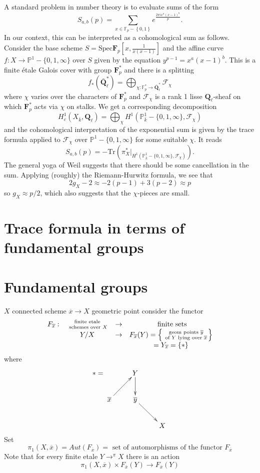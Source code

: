 A standard problem in number theory is to evaluate sums of the form
$$
S_{a,b}(p) = \sum_{x\in \mathbb F_p-\left\{0, 1\right\}} e^{\frac{2\pi
ix^a(x-1)^b}{p}}.
$$
In our context, this can be interpreted as a cohomological sum as follows.
Consider the base scheme $S = \text{Spec} \mathbf{F}_p\left[x,
\frac{1}{x(x-1)}\right]$ and the affine curve $f: X \to \mathbb P^1-\{0, 1,
\infty\}$ over $S$ given by the equation $y^{p-1} = x^a(x-1)^b$. This is a
finite \'etale Galois cover with group $\mathbf{F}_p^*$ and there is a splitting
$$
f_*(\bar{\mathbf{Q}}_\ell^*) =
\bigoplus_{\chi : \mathbb F_p^*\to \bar{\mathbf{Q}}_\ell^*} \mathcal{F}_\chi
$$
where $\chi$ varies over the characters of $\mathbf{F}_p^*$ and
$\mathcal{F}_\chi$ is a rank 1 lisse $\mathbf{Q}_\ell$-sheaf on which
$\mathbf{F}_p^*$ acts via $\chi$ on stalks. We get a corresponding decomposition
$$
H_c^1(X_{\bar k}, \mathbf{Q}_\ell) = \bigoplus_\chi H^1(\mathbb P_{\bar
k}^1-\{0, 1, \infty\}, \mathcal{F}_\chi)
$$
and the cohomological interpretation of the exponential sum is given by the
trace formula applied to $\mathcal{F}_\chi$ over $\mathbb P^1 - \{0, 1,
\infty\}$ for some suitable $\chi$. It reads
$$
S_{a,b}(p) = -\text{Tr}\left(\pi_X^*\big|_{H^1(\mathbb P_{\bar k}^1-\{0, 1,
\infty\}, \mathcal{F}_\chi)}\right).
$$
The general yoga of Weil suggests that there should be some cancellation in the
sum. Applying (roughly) the Riemann-Hurwitz formula, we see that
$$
2g_X-2 \approx -2 (p-1) + 3(p-2) \approx p
$$
so $g_X\approx p/2$, which also suggests that the $\chi$-pieces are small.




\section{Trace formula in terms of fundamental groups}

\section{Fundamental groups} $X$ connected scheme $\overline x\to X$ geometric
point consider the functor
$$
\begin{matrix}
F_{\overline x}: &
\text{ finite etale }\atop \text{ schemes over } X &
\to & \text{ finite sets} \\
&
Y/X &
\to &
F_{\overline x}(Y) =
\left\{\text{ geom points }\overline y\atop \text{ of } Y
\text{ lying over }\overline x\right\} \\
&
&
&
= Y_{\overline x} = \left\{ * \right\}
\end{matrix}
$$
where
$$
* =
\xymatrix{
&
Y \ar[d] &
\\
\overline x \ar[ur] &
{\overline y} \ar[dr] &
\\
&
&
X
}
$$
Set
$$
\pi_1(X, \overline x)
=
Aut(F_{\overline x})
=
\text{ set of automorphisms of the functor }F_{\overline x}
$$
Note that for every finite etale $Y\to^\pi X$ there is an action
$$\pi_1(X, \overline x) \times F_{\overline x}(Y) \to
F_{\overline x}(Y)$$

